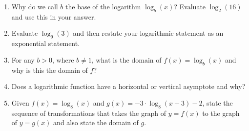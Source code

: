 \begin{myExit}
	\begin{enumerate}
		\item Why do we call $b$ the base of the logarithm $\log_b(x)$?  Evaluate $\log_2(16)$ and use this in your answer.
		\vfill
		\vfill
		\item Evaluate $\log_9(3)$ and then restate your logarithmic statement as an exponential statement.
		\vfill
		\item For any $b>0$, where $b\neq1$, what is the domain of $f(x)= \log_b(x)$ and why is this the domain of $f$?
		\vfill
		\vfill
		\item Does a logarithmic function have a horizontal or vertical asymptote and why?
		\vfill
		\vfill
		\item Given $f(x) = \log_8(x)$ and $g(x)=-3\cdot \log_8(x+3)-2$, state the sequence of transformations that takes the graph of $y=f(x)$ to the graph of $y=g(x)$ and also state the domain of $g$.
		\vfill
		\vfill
	\end{enumerate}
\end{myExit}
\vfill






\newpage
~







